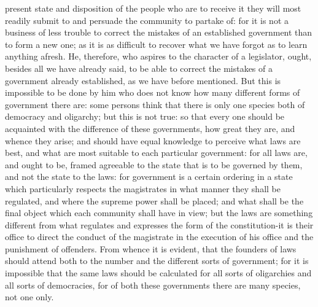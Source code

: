 present state and disposition of the people who are to receive it they
will most readily submit to and persuade the community to partake of: for
it is not a business of less trouble to correct the mistakes of an
established government than to form a new one; as it is as difficult to
recover what we have forgot as to learn anything afresh. He, therefore,
who aspires to the character of a legislator, ought, besides all we have
already said, to be able to correct the mistakes of a government already
established, as we have before mentioned. But this is impossible to be
done by him who does not know how many different forms of government there
are: some persons think that there is only one species both of democracy
and oligarchy; but this is not true: so that every one should be
acquainted with the difference of these governments, how great they are,
and whence they arise; and should have equal knowledge to perceive what
laws are best, and what are most suitable to each particular government:
for all laws are, and ought to be, framed agreeable to the state that is
to be governed by them, and not the state to the laws: for government is a
certain ordering in a state which particularly respects the magistrates in
what manner they shall be regulated, and where the supreme power shall be
placed; and what shall be the final object which each community shall have
in view; but the laws are something different from what regulates and
expresses the form of the constitution-it is their office to direct the
conduct of the magistrate in the execution of his office and the
punishment of offenders. From whence it is evident, that the founders of
laws should attend both to the number and the different sorts of
government; for it is impossible that the same laws should be calculated
for all sorts of oligarchies and all sorts of democracies, for of both
these governments there are many species, not one only.


